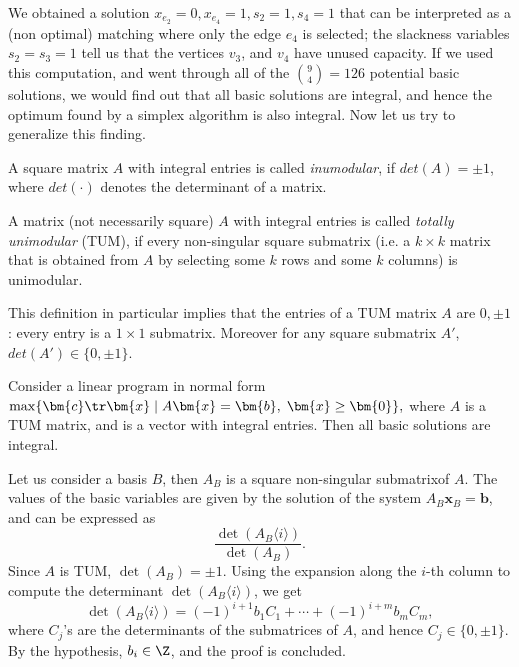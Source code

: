 We obtained a solution
  $x_{e_2}=0, x_{e_4}=1, s_2=1, s_4=1$
that can be interpreted as a (non optimal) matching where only the edge $e_4$ is selected; the
slackness variables  $s_2=s_3=1$ tell us that the vertices  $v_3$, and $v_4$ have unused capacity.
If we used this computation, and went through all of the  ${9\choose4}=126$ potential basic solutions,
we would find out that all basic solutions are integral, and hence the optimum found by a simplex algorithm
is also integral. Now let us try to generalize this finding.

\begin{framed}
  \begin{dfn}
    A square matrix $A$ with integral entries is called {\em inumodular}, if  $det(A)=\pm1$, where $det(\cdot)$
    denotes the determinant of a matrix.
    
    A matrix (not necessarily square) $A$ with integral entries is called {\em totally unimodular} (TUM),
    if every non-singular square submatrix (i.e. a $k\times k$ matrix that is obtained from $A$ by selecting some
    $k$ rows and some $k$ columns) is unimodular.
  \end{dfn}
\end{framed}

\noindent
This definition in particular implies that the entries of a TUM matrix $A$ are $0,\pm1$: every entry is
a $1\times1$ submatrix. Moreover for any square submatrix $A'$, $det(A')\in\{0,\pm1\}$.

\begin{veta}
  \label{thm:tumInteger}
  Consider a linear program in normal form
  $\max\{\bm{c}\tr\bm{x}\mid A\bm{x}=\bm{b},\;\bm{x}\ge\bm{0}\},$
  where $A$ is a TUM matrix, and  is a vector with integral entries. 
  Then all basic solutions are integral.
\end{veta}
\begin{dokaz}
  Let us consider a basis $B$, then  $A_B$ is a square non-singular submatrixof $A$.  
  The values of the basic variables
  are given by the solution of the system
  $A_B\bm{x}_B=\bm{b}$, and can be expressed as 
  $$\frac{\det\left(A_B\langle i\rangle\right)}{\det(A_B)}.$$
  Since $A$ is TUM, $\det(A_B)=\pm1$. 
  Using the expansion along the $i$-th column to compute the determinant
   $\det\left(A_B\langle i\rangle\right)$, we get 
  $$\det\left(A_B\langle i\rangle\right)=(-1)^{i+1}b_1C_1+\cdots+(-1)^{i+m}b_mC_m,$$
  where $C_j$'s  are the determinants of the submatrices of  $A$, and hence $C_j\in\{0,\pm1\}$. 
  By the hypothesis, $b_i\in\Z$, and the proof is concluded.
\end{dokaz}


